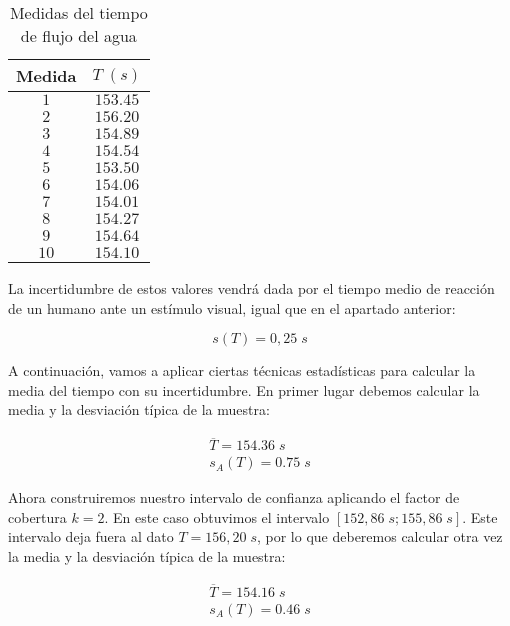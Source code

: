 \documentclass[a4paper,12pt,titlepage]{article}
\begin{document}
\begin{table}[h!]
    \centering
    \begin{tabular}{|c|c|}
    \hline
    Medida & $T \; (s)$\\ \hline
    $1$    & $153.45$ \\ \hline
    $2$    & $156.20$ \\ \hline
    $3$    & $154.89$ \\ \hline
    $4$    & $154.54$ \\ \hline
    $5$    & $153.50$ \\ \hline
    $6$    & $154.06$ \\ \hline
    $7$    & $154.01$ \\ \hline
    $8$    & $154.27$ \\ \hline
    $9$    & $154.64$ \\ \hline
    $10$   & $154.10$ \\ \hline
    \end{tabular}
    \caption{Medidas del tiempo de flujo del agua}
    \label{Tiempos agua}
    \end{table}

    \par La incertidumbre de estos valores vendrá dada por el tiempo medio de reacción de un humano ante un estímulo visual, igual que en el apartado anterior:

    \begin{equation}
        s(T) = 0,25 \; s
    \end{equation}    

    A continuación, vamos a aplicar ciertas técnicas estadísticas para calcular la media del tiempo con su incertidumbre. En primer lugar debemos calcular la media y la desviación típica de la muestra:

    \begin{equation}
        \begin{gathered}
            \overline{T} = 154.36 \; s \\
            s_A (T) = 0.75 \; s
        \end{gathered}
    \end{equation}
    
    Ahora construiremos nuestro intervalo de confianza aplicando el factor de cobertura $k=2$. En este caso obtuvimos el intervalo $[152,86\; s;155,86\; s]$. Este intervalo deja fuera al dato $T=156,20 \; s$, por lo que deberemos calcular otra vez la media y la desviación típica de la muestra:
    
    \begin{equation}
        \begin{gathered}
            \overline{T} = 154.16 \; s \\
            s_A (T) = 0.46 \; s
        \end{gathered}
    \end{equation}
    
\end{document}
